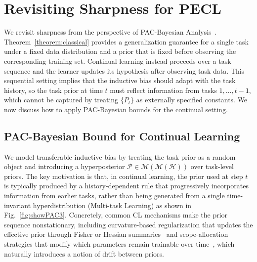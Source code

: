 \documentclass{article}
\theoremstyle{plain}
\theoremstyle{definition}
\theoremstyle{remark}
\begin{document}
\section{Revisiting Sharpness for PECL}
\label{sec:pac-pecl}

We revisit sharpness from the perspective of PAC-Bayesian Analysis~\cite{mcallesterPACBayesianModelAveraging1999}. Theorem~\ref{theorem:classical} provides a generalization guarantee for a single task under a fixed data distribution and a prior that is fixed before observing the corresponding training set. Continual learning instead proceeds over a task sequence and the learner updates its hypothesis after observing task data. This sequential setting implies that the inductive bias should adapt with the task history, so the task prior at time $t$ must reflect information from tasks $1,\dots,t-1$, which cannot be captured by treating $\{P_t\}$ as externally specified constants. We now discuss how to apply PAC-Bayesian bounds for the continual setting.

\subsection{PAC-Bayesian Bound for Continual Learning}
\label{sec:single_to_cl}

We model transferable inductive bias by treating the task prior as a random object and introducing a hyperposterior $\mathcal P\in\mathcal M(\mathcal M(\mathcal H))$ over task-level priors. The key motivation is that, in continual learning, the prior used at step $t$ is typically produced by a history-dependent rule that progressively incorporates information from earlier tasks, rather than being generated from a single time-invariant hyperdistribution (Multi-task Learning) as shown in Fig.~\ref{fig:showPAC3}. Concretely, common CL mechanisms make the prior sequence nonstationary, including curvature-based regularization that updates the effective prior through Fisher or Hessian summaries~\citep{EWC2017,SI2017} and scope-allocation strategies that modify which parameters remain trainable over time~\citep{progressive2016,HAT2018,Supermasks2020,pmlr-v97-houlsby19a}, which naturally introduces a notion of drift between priors.
\end{document}
